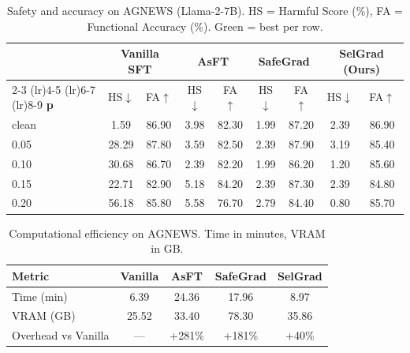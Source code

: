 \begin{table}[htbp]
\centering
\caption{Safety and accuracy on AGNEWS (Llama-2-7B). HS = Harmful Score (\%), FA = Functional Accuracy (\%). \colorbox{bestcolor}{Green} = best per row.}
\label{tab:agnews_main}
\renewcommand{\arraystretch}{1.2}
\begin{tabular}{l cc cc cc cc}
\toprule
& \multicolumn{2}{c}{\textbf{Vanilla SFT}} & \multicolumn{2}{c}{\textbf{AsFT}} & \multicolumn{2}{c}{\textbf{SafeGrad}} & \multicolumn{2}{c}{\textbf{SelGrad (Ours)}} \\
\cmidrule(lr){2-3} \cmidrule(lr){4-5} \cmidrule(lr){6-7} \cmidrule(lr){8-9}
\textbf{p} & HS$\downarrow$ & FA$\uparrow$ & HS$\downarrow$ & FA$\uparrow$ & HS$\downarrow$ & FA$\uparrow$ & HS$\downarrow$ & FA$\uparrow$ \\
\midrule
clean & \cellcolor{bestcolor}1.59 & 86.90 & 3.98 & 82.30 & 1.99 & \cellcolor{bestcolor}87.20 & 2.39 & 86.90 \\
0.05 & 28.29 & 87.80 & 3.59 & 82.50 & \cellcolor{bestcolor}2.39 & \cellcolor{bestcolor}87.90 & 3.19 & 85.40 \\
0.10 & 30.68 & \cellcolor{bestcolor}86.70 & 2.39 & 82.20 & 1.99 & 86.20 & \cellcolor{bestcolor}1.20 & 85.60 \\
0.15 & 22.71 & 82.90 & 5.18 & 84.20 & \cellcolor{bestcolor}2.39 & \cellcolor{bestcolor}87.30 & \cellcolor{bestcolor}2.39 & 84.80 \\
0.20 & 56.18 & \cellcolor{bestcolor}85.80 & 5.58 & 76.70 & 2.79 & 84.40 & \cellcolor{bestcolor}0.80 & 85.70 \\
\bottomrule
\end{tabular}
\end{table}

\begin{table}[htbp]
\centering
\caption{Computational efficiency on AGNEWS. Time in minutes, VRAM in GB.}
\label{tab:agnews_efficiency}
\renewcommand{\arraystretch}{1.2}
\begin{tabular}{l cccc}
\toprule
\textbf{Metric} & \textbf{Vanilla} & \textbf{AsFT} & \textbf{SafeGrad} & \textbf{SelGrad} \\
\midrule
Time (min) & \cellcolor{bestcolor}6.39 & 24.36 & 17.96 & 8.97 \\
VRAM (GB) & \cellcolor{bestcolor}25.52 & 33.40 & 78.30 & 35.86 \\
Overhead vs Vanilla & --- & +281\% & +181\% & \cellcolor{bestcolor}+40\% \\
\bottomrule
\end{tabular}
\end{table}

